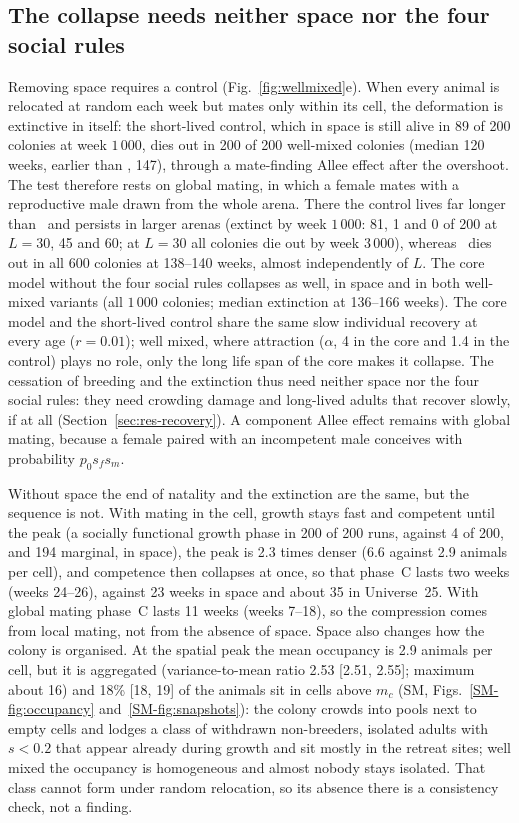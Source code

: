 \subsection{The collapse needs neither space nor the four social rules}
\label{sec:res-wm}

Removing space requires a control (Fig.~\ref{fig:wellmixed}e). When every animal is relocated at random each week
but mates only within its cell, the deformation is extinctive in itself: the short-lived control, which in space is
still alive in 89 of 200 colonies at week $1\,000$, dies out in 200 of 200 well-mixed colonies (median 120 weeks,
earlier than \Cone, 147), through a mate-finding Allee effect after the overshoot. The test therefore rests on
global mating, in which a female mates with a reproductive male drawn from the whole arena. There the control lives
far longer than \Cone\ and persists in larger arenas (extinct by week $1\,000$: 81, 1 and 0 of 200 at $L=30$, 45
and 60; at $L=30$ all colonies die out by week $3\,000$), whereas \Cone\ dies out in all 600 colonies at 138--140
weeks, almost independently of $L$. The core model without the four social rules collapses as well, in space and in
both well-mixed variants (all $1\,000$ colonies; median extinction at 136--166 weeks). The core model and the
short-lived control share the same slow individual recovery at every age ($r=0.01$); well mixed, where attraction
($\alpha$, 4 in the core and 1.4 in the control) plays no role, only the long life span of the core makes it
collapse. The cessation of breeding and the extinction thus need neither space nor the four social
rules: they need crowding damage and long-lived adults that recover slowly, if at all
(Section~\ref{sec:res-recovery}). A component
Allee effect remains with global mating, because a female paired with an incompetent male conceives with
probability $p_0s_fs_m$.

Without space the end of natality and the extinction are the same, but the sequence is not. With mating in the
cell, growth stays fast and competent until the peak (a socially functional growth phase in 200 of 200 runs, against
4 of 200, and 194 marginal, in space), the peak is 2.3 times denser (6.6 against 2.9 animals per cell), and
competence then collapses at once, so that phase~C lasts two weeks (weeks 24--26), against 23 weeks in space and
about 35 in Universe~25. With global mating phase~C lasts 11 weeks (weeks 7--18), so the compression comes from local
mating, not from the absence of space. Space also changes how the colony is organised. At the spatial
peak the mean occupancy is 2.9 animals per cell, but it is aggregated (variance-to-mean ratio 2.53 [2.51, 2.55];
maximum about 16) and 18\% [18, 19] of the animals sit in cells above $m_c$ (SM, Figs.~\ref{SM-fig:occupancy}
and~\ref{SM-fig:snapshots}): the colony crowds into pools next to empty cells and lodges a class of withdrawn
non-breeders, isolated adults with $s<0.2$ that appear already during growth and sit mostly in the retreat
sites; well mixed the occupancy is homogeneous and almost nobody stays isolated. That class cannot form under random
relocation, so its absence there is a consistency check, not a finding.


